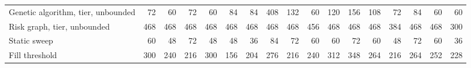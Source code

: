 \begin{table}[!htbp]
\begin{tabular}{lrrrrrrrrrrrrrrrr}
Genetic algorithm, tier, unbounded & 72 & 60 & 72 & 60 & 84 & 84 & 408 & 132 & 60 & 120 & 156 & 108 & 72 & 84 & 60 & 60 \\
Risk graph, tier, unbounded & 468 & 468 & 468 & 468 & 468 & 468 & 468 & 468 & 456 & 468 & 468 & 468 & 384 & 468 & 468 & 300 \\
Static sweep & 60 & 48 & 72 & 48 & 48 & 36 & 84 & 72 & 60 & 60 & 72 & 60 & 48 & 72 & 60 & 36 \\
Fill threshold & 300 & 240 & 216 & 300 & 156 & 204 & 276 & 216 & 240 & 312 & 348 & 264 & 216 & 264 & 252 & 228 \\
\bottomrule
\end{tabular}
\end{table}
